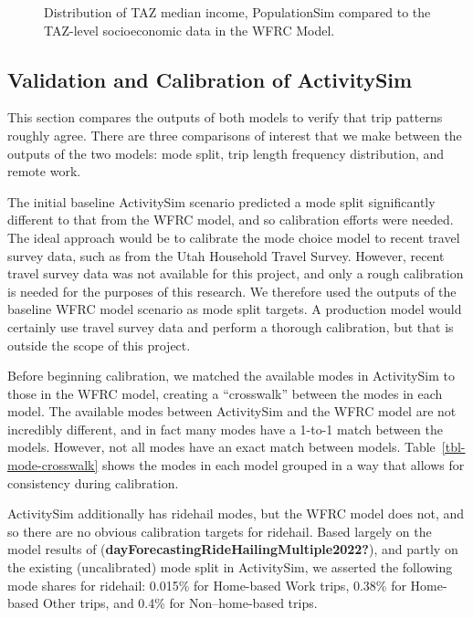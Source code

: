 \documentclass[fancy, twoside, mastersfancy, ms]{byuthesis}
\begin{document}
\begin{figure}


\caption{\label{fig-median-income-density}Distribution of TAZ median
income, PopulationSim compared to the TAZ-level socioeconomic data in
the WFRC Model.}

\end{figure}%

\subsection{Validation and Calibration of
ActivitySim}\label{sec-baseline-calibration}

This section compares the outputs of both models to verify that trip
patterns roughly agree. There are three comparisons of interest that we
make between the outputs of the two models: mode split, trip length
frequency distribution, and remote work.

The initial baseline ActivitySim scenario predicted a mode split
significantly different to that from the WFRC model, and so calibration
efforts were needed. The ideal approach would be to calibrate the mode
choice model to recent travel survey data, such as from the Utah
Household Travel Survey. However, recent travel survey data was not
available for this project, and only a rough calibration is needed for
the purposes of this research. We therefore used the outputs of the
baseline WFRC model scenario as mode split targets. A production model
would certainly use travel survey data and perform a thorough
calibration, but that is outside the scope of this project.

Before beginning calibration, we matched the available modes in
ActivitySim to those in the WFRC model, creating a ``crosswalk'' between
the modes in each model. The available modes between ActivitySim and the
WFRC model are not incredibly different, and in fact many modes have a
1-to-1 match between the models. However, not all modes have an exact
match between models. Table~\ref{tbl-mode-crosswalk} shows the modes in
each model grouped in a way that allows for consistency during
calibration.

ActivitySim additionally has ridehail modes, but the WFRC model does
not, and so there are no obvious calibration targets for ridehail. Based
largely on the model results of
(\textbf{dayForecastingRideHailingMultiple2022?}), and partly on the
existing (uncalibrated) mode split in ActivitySim, we asserted the
following mode shares for ridehail: 0.015\% for Home-based Work trips,
0.38\% for Home-based Other trips, and 0.4\% for Non--home-based trips.
\end{document}
